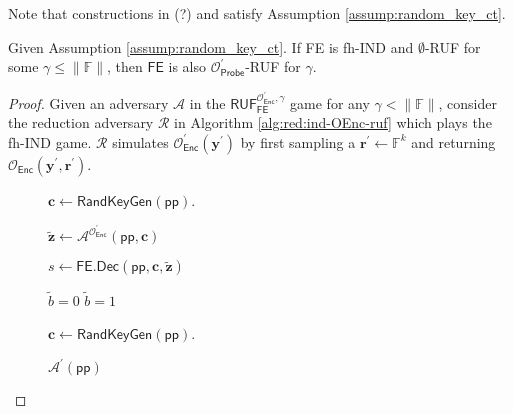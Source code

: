 Note that constructions in \cite{cryptoeprint:2015/1255} (?) and \cite{10.1007/978-3-319-45871-7_24, cryptoeprint:2016/440} satisfy Assumption \ref{assump:random_key_ct}.

\begin{theorem}
\label{thm:fh-IPFE:ind-OEnc-ruf}
Given Assumption \ref{assump:random_key_ct}. If \textsf{FE} is fh-IND and $\emptyset$-RUF for some $\gamma \leq \|\mathbb{F}\|$, then $\textsf{FE}$ is also $\mathcal{O}^\prime_{\textsf{Probe}}$-RUF for $\gamma$.

\end{theorem}

\begin{proof}

Given an adversary $\mathcal{A}$ in the $\textsf{RUF}^{\mathcal{O}^\prime_{\textsf{Enc}}, \gamma}_{\textsf{FE}}$ game for any $\gamma < \|\mathbb{F}\|$, consider the reduction adversary $\mathcal{R}$ in Algorithm \ref{alg:red:ind-OEnc-ruf} which plays the \textsf{fh-IND} game. $\mathcal{R}$ simulates $\mathcal{O}_\textsf{Enc}^\prime(\mathbf{y}^\prime)$ by first sampling a $\mathbf{r}^\prime \gets \mathbb{F}^k$ and returning $\mathcal{O}_\textsf{Enc}(\mathbf{y}^\prime, \mathbf{r}^\prime)$.

\begin{figure}[h]
\centering

	\begin{minipage}{0.4\linewidth}
	\centering
	\begin{algorithm}[H]
	\caption{$\mathcal{R}^{\mathcal{O}_{\textsf{KeyGen}}, \mathcal{O}_{\textsf{Enc}}}(\textsf{pp})$}
	\label{alg:red:ind-OEnc-ruf}
	\begin{algorithmic}[1]
		\State $\mathbf{c} \gets \textsf{RandKeyGen}(\textsf{pp})$. 

		\State ${\mathbf{\tilde{z}}} \gets {\mathcal{A}}^{\mathcal{O}^\prime_{\textsf{Enc}}} (\textsf{pp}, \mathbf{c})$

		\State $s \gets \textsf{FE.Dec}( \textsf{pp}, \mathbf{c}, \mathbf{\tilde{z}} )$
		
			\State \Return $\tilde{b} = 0$
		\Else
			\State \Return $\tilde{b} = 1$
		\EndIf

	\end{algorithmic}
	\end{algorithm}
	\end{minipage}
	\hspace{0.05\textwidth}
	\begin{minipage}{0.4\linewidth}
	\centering
	\begin{algorithm}[H]
	\caption{$\mathcal{A}^\prime (\textsf{pp})$}
	\label{alg:adv:ind-OEnc-ruf}
	\begin{algorithmic}[1]
		\State $\mathbf{c} \gets \textsf{RandKeyGen}(\textsf{pp})$. 


\end{algorithmic}
\end{algorithm}
\end{minipage}
\end{figure}
\end{proof}
